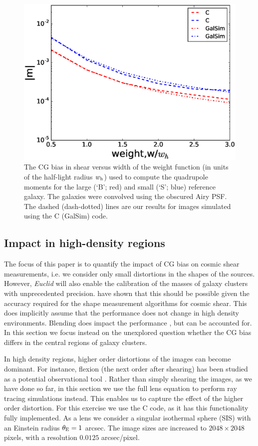 \documentclass[useAMS,usenatbib]{mnras}
\begin{document}
%
\begin{figure}
  \centerline{\includegraphics[width=\hsize]{zweight_airy.eps}}
\caption{The CG bias in shear versus width of the weight function (in
  units of the half-light radius $w_{\rm h}$) used to compute the
  quadrupole moments for the large (`B'; red) and small (`S';
  blue) reference galaxy. The galaxies were convolved using the obscured Airy
  PSF. The dashed (dash-dotted) lines are our
  results for images simulated using the {\sc C} ({\sc GalSim}) code.}
\label{fig:biasofweight}
\end{figure}
%
\subsection{Impact in high-density regions}

The focus of this paper is to quantify the impact of CG bias on cosmic shear measurements, 
i.e. we consider only small distortions in the shapes of the sources. However, {\it Euclid} will
also enable the calibration of the masses of galaxy clusters with unprecedented precision.
\cite{Koehlinger15} have shown that this should be possible given the accuracy required 
for the shape measurement algorithms for cosmic shear. This does implicitly assume that the 
performance does not change in high density environments. Blending does impact the performance
\citep{Hoekstra17}, but can be accounted for. In this section we focus instead on the unexplored question
whether the CG bias differs in the central regions of galaxy clusters.

In high density regions, higher order distortions of the images can become dominant. For instance, flexion (the next order after shearing) has been studied as a potential observational tool
\citep[e.g.][]{2002ApJ...564...65G,bacon2006}. Rather than simply shearing the images, as we have done so far, in this section we use the full lens equation to perform ray tracing simulations instead. This enables
us to capture the effect of the higher order distortion. For this exercise we use the {\sc C} code, as it has
this functionality fully implemented. As a lens we consider a singular isothermal sphere (SIS) with
an Einstein radius $\theta_{\rm E}=1$ arcsec. The image sizes are increased to $2048\times2048$ pixels, with a resolution $0.0125$ arcsec/pixel. 
\end{document}
